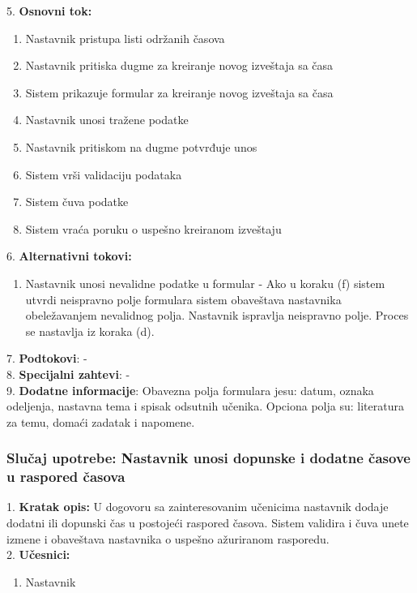 \documentclass{article}
\begin{document}
5. \textbf{Osnovni tok:} 
\begin{enumerate} [label=(\alph*)]
\item Nastavnik pristupa listi održanih časova
\item Nastavnik pritiska dugme za kreiranje novog izveštaja sa časa
\item Sistem prikazuje formular za kreiranje novog izveštaja sa časa
\item Nastavnik unosi tražene podatke 
\item Nastavnik pritiskom na dugme potvrđuje unos
\item Sistem vrši validaciju podataka
\item Sistem čuva podatke
\item Sistem vraća poruku o uspešno kreiranom izveštaju
\end{enumerate}

6. \textbf{Alternativni tokovi:}
\begin{enumerate} [label=(\roman*)]
\item Nastavnik unosi nevalidne podatke u formular - Ako u koraku (f) sistem utvrdi neispravno polje formulara sistem obaveštava nastavnika obeležavanjem nevalidnog polja. Nastavnik ispravlja neispravno polje. Proces se nastavlja iz koraka (d).
\end{enumerate}

7. \textbf{Podtokovi}: - \\

8. \textbf{Specijalni zahtevi}: - \\

9. \textbf{Dodatne informacije}: Obavezna polja formulara jesu: datum, oznaka odeljenja, nastavna tema i spisak odsutnih učenika. Opciona polja su: literatura za temu, domaći zadatak i napomene. \\


\subsubsection{Slučaj upotrebe: Nastavnik unosi dopunske i dodatne časove u raspored časova } 
1. \textbf{Kratak opis:} U dogovoru sa zainteresovanim učenicima nastavnik dodaje dodatni ili dopunski čas u postojeći raspored časova. Sistem validira i čuva unete izmene i obaveštava nastavnika o uspešno ažuriranom rasporedu. \\

2. \textbf{Učesnici:}
\begin{enumerate} [label=(\alph*)]
\item Nastavnik
\end{enumerate} 
\end{document}
